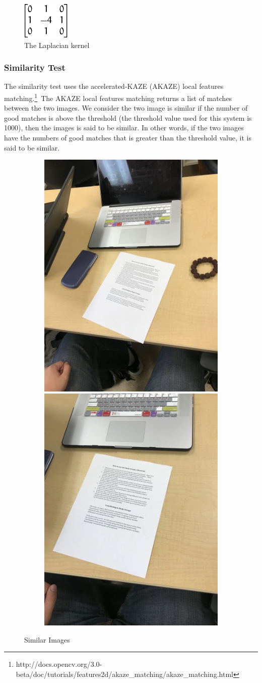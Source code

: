 \begin{figure}
	\centering
    \includegraphics[scale = 0.5]{laplacian_kernel.png}
    
    \caption{The Laplacian kernel}
	\label{laplacianKernel}
\end{figure}

\subsubsection{Similarity Test}
The similarity test uses the accelerated-KAZE (AKAZE) local features matching.\footnote{http://docs.opencv.org/3.0-beta/doc/tutorials/features2d/akaze\_matching/akaze\_matching.html}~The AKAZE local features matching returns a list of matches between the two images. We consider the two image is similar if the number of good matches is above the threshold (the threshold value used for this system is 1000), then the images is said to be similar. In other words, if the two images have the numbers of good matches that is greater than the threshold value, it is said to be similar.

\begin{figure}
  \begin{subfigure}{\linewidth}
	  \includegraphics[width=.4\linewidth]{similar1.JPG}\hfill
	  \includegraphics[width=.4\linewidth]{similar2.JPG}
  \end{subfigure}\par\medskip  
  
    \caption{Similar Images}
	\label{similarImages}
\end{figure}


